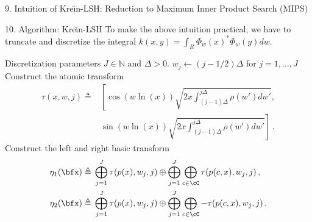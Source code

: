 \documentclass[final]{beamer}
\newcommand{\kr}{Kre\u{\i}n\xspace}
\DeclareMathOperator{\sech}{sech}
\newcommand{\eg}{\emph{e.g.}\xspace}
\newlength{\onecolwid}
\begin{document}
\begin{frame}[t]
\begin{columns}[t]
\begin{column}{\onecolwid}
\begin{block}{9. Intuition of \kr-LSH: Reduction to Maximum Inner Product Search (MIPS)}
		
	\end{block}
	\begin{block}{10. Algorithm: \kr-LSH}
	To make the above intuition 
		practical, we have
		to truncate and discretize the 
		integral $ k(x,y) = \int_R \Phi_w(x)^* \Phi_w(y) 
		dw  $.
			\begin{algorithmic}[1]
				\Require Discretization parameters $ J\in \mathbb{N} $ and $ 
				\Delta>0 $.
				\State $ w_j \gets (j-1/2)\Delta $ for $ j=1,\dots,J $
				\State Construct the atomic transform \begin{align*}
				\tau(x,w,j)\triangleq{}&
				\left[\cos(w\ln(x))\sqrt{2x\int_{(j-1)\Delta}^{j\Delta} 
					\rho(w')dw'},\right.\\
					& \left.\sin(w\ln(x))\sqrt{ 
					2x\int_{(j-1)\Delta}^{j\Delta} 
					\rho(w')dw' }\right]
				\,.
				\end{align*}
				\State Construct the left and right basic transform 
				\begin{align*}
				\eta_1(\bfx)\triangleq{} & \bigoplus_{j=1}^J 
				\tau(p(x),w_j,j)\oplus 
				\bigoplus_{j=1}^{J} \bigoplus_{c\in \cC} \tau(p(c,x),w_j,j)\,,\\
				\eta_2(\bfx)\triangleq{} & \bigoplus_{j=1}^J 
				\tau(p(x),w_j,j)\oplus 
				\bigoplus_{j=1}^{J} \bigoplus_{c\in \cC} -\tau(p(c,x),w_j,j)\,.
				\end{align*}

\end{algorithmic}
\end{block}
\end{column}
\end{columns}
\end{frame}
\end{document}
